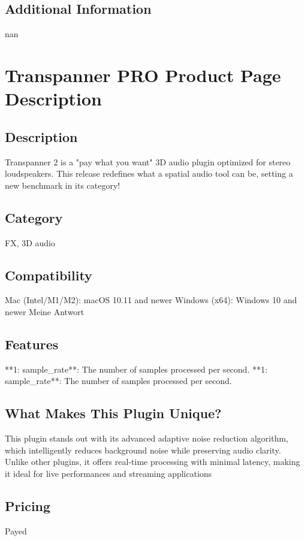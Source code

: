 \documentclass[8pt]{article}
\begin{document}
{{{{    \subsection*{Additional Information}
    nan
    

    \section*{Transpanner PRO  Product Page Description}

    \subsection*{Description}
    Transpanner 2 is a "pay what you want" 3D audio plugin optimized for stereo loudspeakers. This release redefines what a spatial audio tool can be, setting a new benchmark in its category!

    \subsection*{Category}
    FX, 3D audio

    \subsection*{Compatibility}
    Mac (Intel/M1/M2): macOS 10.11 and newer
Windows (x64): Windows 10 and newer
Meine Antwort


    \subsection*{Features}
    **1: sample_rate**: The number of samples processed per second.
**1: sample_rate**: The number of samples processed per second.

    \subsection*{What Makes This Plugin Unique?}
    This plugin stands out with its advanced adaptive noise reduction algorithm, which intelligently reduces background noise while preserving audio clarity. Unlike other plugins, it offers real-time processing with minimal latency, making it ideal for live performances and streaming applications

    \subsection*{Pricing}
    Payed

}}}}
\end{document}
